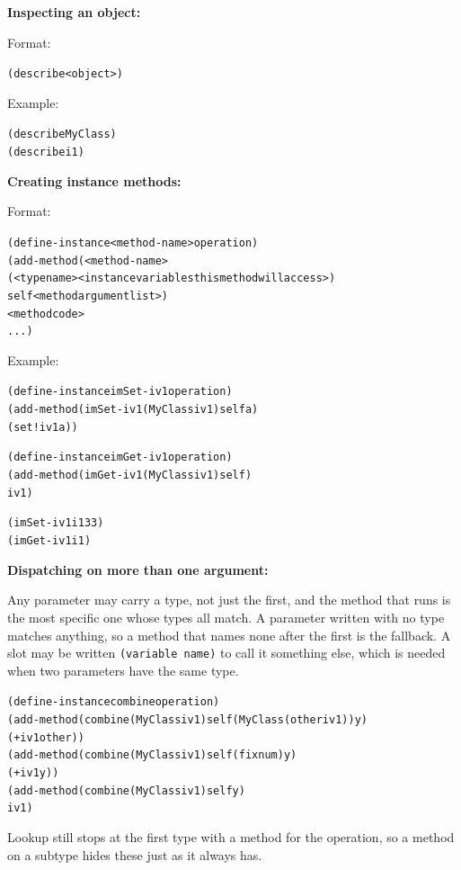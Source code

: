 \documentclass[12pt]{article}
\begin{document}
\textbf{Inspecting an object:}

Format:

\begin{alltt}
   (describe <object>)
\end{alltt}

Example:

\begin{alltt}
   (describe MyClass)
   (describe i1)
\end{alltt}


\textbf{Creating instance methods:}

Format:

\begin{alltt}
   (define-instance <method-name> operation)
   (add-method (<method-name>
                     (<type name>  <instance variables this method will access>)
                     self  <method argument list>)
               <method code>
               ...)
\end{alltt}

\newpage

Example:

\begin{alltt}
   (define-instance imSet-iv1 operation)
   (add-method (imSet-iv1 (MyClass iv1) self a)
               (set! iv1 a))
  
   (define-instance imGet-iv1 operation)
   (add-method (imGet-iv1 (MyClass iv1) self)
               iv1)

   (imSet-iv1 i1 33)
   (imGet-iv1 i1)
\end{alltt}


\textbf{Dispatching on more than one argument:}

Any parameter may carry a type, not just the first, and the method
that runs is the most specific one whose types all match.  A
parameter written with no type matches anything, so a method that
names none after the first is the fallback.  A slot may be written
\texttt{(variable name)} to call it something else, which is needed
when two parameters have the same type.

\begin{alltt}
   (define-instance combine operation)
   (add-method (combine (MyClass iv1) self (MyClass (other iv1)) y)
               (+ iv1 other))
   (add-method (combine (MyClass iv1) self (fixnum) y)
               (+ iv1 y))
   (add-method (combine (MyClass iv1) self y)
               iv1)
\end{alltt}

Lookup still stops at the first type with a method for the operation,
so a method on a subtype hides these just as it always has.
\end{document}
